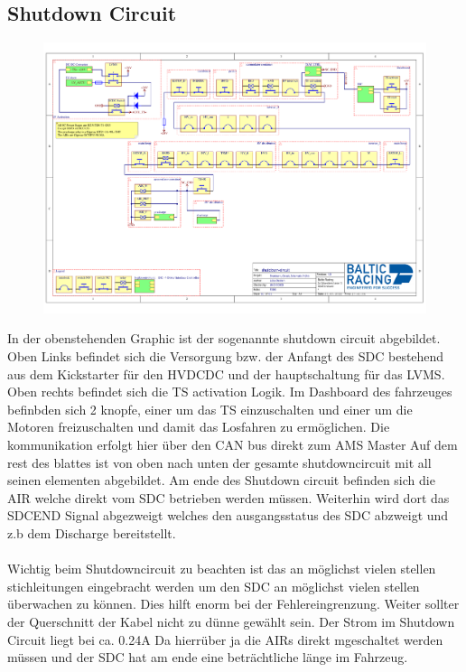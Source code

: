 \subsection{Shutdown Circuit}
\begin{figure}[h]
	\centering
	\includegraphics[width=1\linewidth]{bilder/Shutdowncircuit}
	\caption[Shutdown Circuit Schematic]{}
	\label{fig:shutdowncircuit}
\end{figure}

In der obenstehenden Graphic ist der sogenannte shutdown circuit abgebildet. Oben Links befindet sich die Versorgung bzw. der Anfangt des SDC bestehend aus dem Kickstarter für den HVDCDC und der hauptschaltung für das LVMS. Oben rechts befindet sich die TS activation Logik. Im Dashboard des fahrzeuges befinbden sich 2 knopfe, einer um das TS einzuschalten und einer um die Motoren freizuschalten und damit das Losfahren zu ermöglichen. Die kommunikation erfolgt hier über den CAN bus direkt zum AMS Master Auf dem rest des blattes ist von oben nach unten der gesamte shutdowncircuit mit all seinen elementen abgebildet. Am ende des Shutdown circuit befinden sich die AIR welche direkt vom SDC betrieben werden müssen. Weiterhin wird dort das SDCEND Signal abgezweigt welches den ausgangsstatus des SDC abzweigt und z.b dem Discharge bereitstellt.\\
\\
Wichtig beim Shutdowncircuit zu beachten ist das an möglichst vielen stellen stichleitungen eingebracht werden um den SDC an möglichst vielen stellen überwachen zu können. Dies hilft enorm bei der Fehlereingrenzung. Weiter sollter der Querschnitt der Kabel nicht zu dünne gewählt sein. Der Strom im Shutdown Circuit liegt bei ca. 0.24A Da hierrüber ja die AIRs direkt mgeschaltet werden müssen und der SDC hat am ende eine beträchtliche länge im Fahrzeug. 

